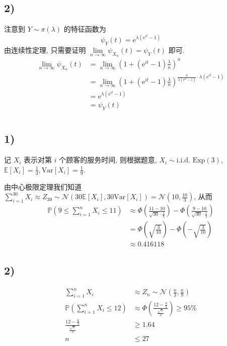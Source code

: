 \documentclass[8pt]{article}
\theoremstyle{compact}
\def\le{\leqslant}
\def\ge{\geqslant}
\def\P#1{\mathbb{P}\left({#1}\right)}
\def\e{\mathrm{e}}
\def\E#1{\mathbb{E}\left[{#1}\right]}
\def\Var#1{\text{Var}\left[{#1}\right]}
\begin{document}
\subsection*{2)}
注意到 $Y \sim \pi(\lambda)$ 的特征函数为 $$\psi_Y(t) = \e^{\lambda(\e^{it}-1)}$$ 由连续性定理, 只需要证明 $\lim\limits_{n \to \infty}\psi_{X_n}(t) = \psi_Y(t)$ 即可.
\begin{equation*}
	\begin{split}
		\lim\limits_{n \to \infty}\psi_{X_n}(t) &= \lim\limits_{n \to \infty} \left(1 + (\e^{it} - 1)\frac{\lambda}{n}\right)^n\\
		&= \lim\limits_{n\to\infty} \left(1 + (\e^{it} - 1)\frac{\lambda}{n}\right)^{\frac{n}{\lambda(\e^{it}-1)} \cdot \lambda(\e^{it}-1)}\\
		&= \e^{\lambda(\e^{it}-1)}\\
		&= \psi_Y(t)
	\end{split}
\end{equation*}

\section{}
\subsection*{1)}
记 $X_i$ 表示对第 $i$ 个顾客的服务时间, 则根据题意, $X_i \sim \text{i.i.d. Exp}(3)$, $\E{X_i} = \frac13, \Var{X_i} = \frac19$.

由中心极限定理我们知道 $\sum\limits_{i=1}^{30}X_i \approx Z_{30} \sim \mathcal N(30\E{X_i}, 30\Var{X_i}) = \mathcal N(10, \frac{10}{3})$, 从而
\begin{equation*}
	\begin{split}
		\P{9 \le \sum_{i=1}^{n}X_i \le 11} &\approx \Phi\left(\frac{11 - 10}{\sqrt{30}\cdot \frac13}\right) - \Phi\left(\frac{9 - 10}{\sqrt{30}\cdot \frac13}\right)\\
		&= \Phi\left(\sqrt{\frac{3}{10}}\right) - \Phi\left(-\sqrt{\frac{3}{10}}\right)\\
		&\approx 0.416118
	\end{split}
\end{equation*}
\subsection*{2)}
\begin{equation*}
	\begin{split}
		\sum\limits_{i=1}^{n}X_i &\approx Z_n \sim \mathcal N\left(\frac n3, \frac n9\right) \\
		\P{\sum\limits_{i=1}^{n}X_i \le 12} & \approx \Phi\left(\frac{12 - \frac n3}{\frac{\sqrt n}{3}}\right) \ge 95\% \\
		\frac{12 - \frac n3}{\frac{\sqrt n}{3}} &\ge 1.64 \\
		n &\le 27
	\end{split}
\end{equation*}
\end{document}
